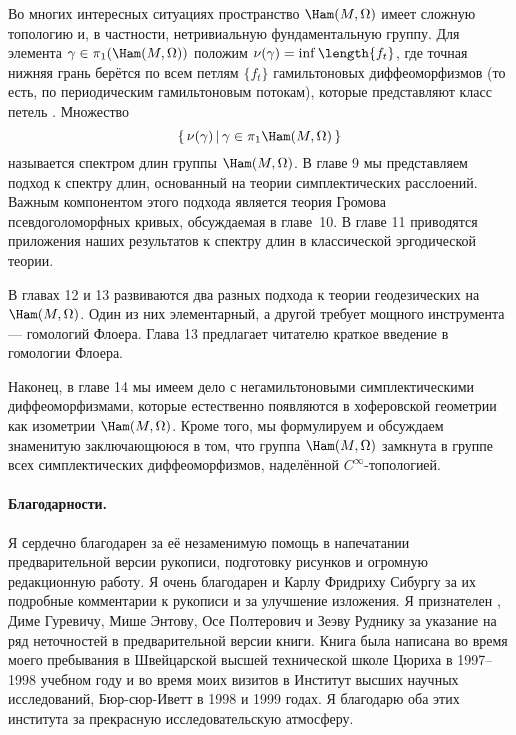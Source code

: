 Во многих интересных ситуациях пространство $\Ham(M,\Omega)$ имеет сложную топологию и, в частности, нетривиальную фундаментальную группу.
Для элемента $\gamma\in\pi_1(\Ham(M,\Omega))$ положим $\nu(\gamma) \z= \inf \length \{f_t\}$, где
точная нижняя грань берётся по всем петлям $\{f_t\}$ гамильтоновых
диффеоморфизмов (то есть, по периодическим гамильтоновым потокам),
которые представляют класс петель .
Множество
\[\set{\nu(\gamma)}{\gamma\in\pi_{1}\Ham(M,\Omega)}\]
называется спектром длин группы $\Ham(M,\Omega)$.
В главе 9 мы представляем подход к спектру длин, основанный на теории симплектических расслоений.
Важным компонентом этого подхода является теория Громова псевдоголоморфных кривых, обсуждаемая в главе~10.
В главе 11 приводятся приложения наших результатов к спектру длин в классической эргодической теории.

В главах 12 и 13 развиваются два разных подхода к теории геодезических на $\Ham(M,\Omega)$.
Один из них элементарный, а другой требует мощного инструмента --- гомологий Флоера.
Глава 13 предлагает читателю краткое введение в гомологии Флоера.

Наконец, в главе 14 мы имеем дело с негамильтоновыми симплектическими диффеоморфизмами, которые естественно появляются в хоферовской геометрии как изометрии $\Ham(M,\Omega)$.
Кроме того, мы формулируем и обсуждаем знаменитую 
заключающююся в том, что группа $\Ham(M,\Omega)$ замкнута в группе всех симплектических диффеоморфизмов, наделённой $C^\infty$-топологией. 

\paragraph*{Благодарности.}
Я сердечно благодарен  %
за её незаменимую помощь в напечатании предварительной версии рукописи,
подготовку рисунков и огромную редакционную работу.
Я очень благодарен  и Карлу Фридриху Сибургу за их подробные комментарии к рукописи и за улучшение изложения.
Я признателен , Диме Гуревичу, Мише Энтову, Осе Полтерович и Зеэву Руднику за указание на ряд неточностей в предварительной версии книги.
Книга была написана во время моего пребывания в Швейцарской высшей технической школе Цюриха в 1997--1998 учебном году и во время моих визитов в Институт высших научных исследований, Бюр-сюр-Иветт в 1998 и 1999 годах.
Я благодарю оба этих института за прекрасную исследовательскую атмосферу. 

